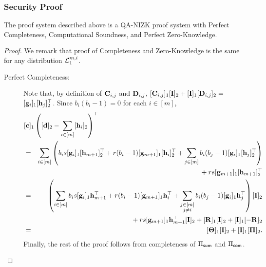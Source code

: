 \subsubsection{Security Proof}
\begin{theorem} \label{theo:bits}
The proof system described above is a QA-NIZK proof system with Perfect Completeness, Computational Soundness, and Perfect Zero-Knowledge.
\end{theorem}	
\begin{proof}
We remark that proof of Completeness and Zero-Knowledge is the same for any distribution $\mathcal{L}_1^{m,i}$.
\begin{description}
\item[Perfect Completeness:]
Note that,
by definition of $\mathbf{{C}}_{i,j}$ and $\mathbf{{D}}_{i,j}$, 
$[\mathbf{{C}}_{i,j}]_1[\mathbf{{I}}]_2+[\mathbf{{I}}]_1[\mathbf{{D}}_{i,j}]_2=$
$[\mathbf{g}_{i}]_1[\mathbf{h}_j]_2^\top$.  Since $b_i(b_i-1) = 0$ for each $i\in[m]$,
\begin{eqnarray*}
\lefteqn{
[\vecb{c}]_1\left( [\vecb{d}]_2 - \sum_{i\in[m]} [\vecb{h}_{i}]_2\right)^\top}\\
& = & 
    \sum_{i \in [m]}\left(
        b_i s[\vecb{g}_{i}]_1[\vecb{h}_{m+1}]_2^{\top}+
        r(b_i-1)[\vecb{g}_{m+1}]_1[\vecb{h}_i]_2^{\top}+
        \sum_{j \in [m]} b_i (b_j-1)[\vecb{g}_{i}]_1[\vecb{h}_{j}]_2^{\top}
    \right)
\\ & & \mbox{ }
    + rs[\vecb{g}_{m+1}]_1[\vecb{h}_{m+1}]_2^{\top}\\
& = & 
    \left(\sum_{i\in[m]}b_is[\vecb{g}_{i}]_1\vecb{h}_{m+1}^{\top}+r(b_i-1)[\vecb{g}_{m+1}]_1\vecb{h}_i^{\top}+
        \sum_{\substack{j \in [m]\\j\neq i}}b_i(b_j-1)[\vecb{g}_{i}]_1\vecb{h}_{j}^{\top}\right)[\matr{I}]_2\\
& & \mbox{ }
    +rs[\vecb{g}_{m+1}]_1\vecb{h}_{m+1}^{\top}[\matr{I}]_2
    +[\matr{R}]_1[\matr{I}]_2 + [\matr{I}]_1[-\matr{R}]_2
\\ & = &
    [\matr{\Theta}]_1[\matr{I}]_2+
    [\matr{I}]_1[\matr{\Pi}]_2.
\end{eqnarray*}
Finally, the rest of the proof follows from completeness of $\Pi_{\mathsf{sum}}$ and $\Pi_{\mathsf{com}}$. 


\end{description}
\end{proof}
